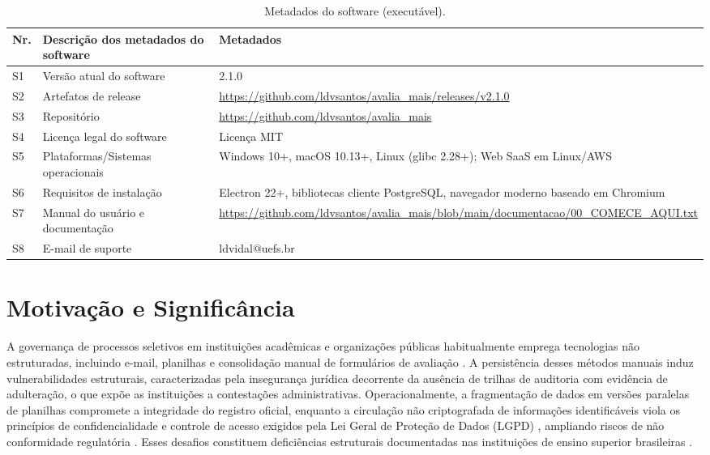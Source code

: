 \documentclass[preprint,12pt,a4paper]{elsarticle}
\begin{document}
\begin{table}[!h]
\begin{tabular}{|l|p{6.5cm}|p{6.5cm}|}
\hline
\textbf{Nr.} & \textbf{Descrição dos metadados do software} & \textbf{Metadados} \\
\hline
S1 & Versão atual do software & 2.1.0 \\
\hline
S2 & Artefatos de release & \url{https://github.com/ldvsantos/avalia_mais/releases/v2.1.0} \\
\hline
S3 & Repositório & \url{https://github.com/ldvsantos/avalia_mais} \\
\hline
S4 & Licença legal do software & Licença MIT \\
\hline
S5 & Plataformas/Sistemas operacionais & Windows 10+, macOS 10.13+, Linux (glibc 2.28+); Web SaaS em Linux/AWS \\
\hline
S6 & Requisitos de instalação & Electron 22+, bibliotecas cliente PostgreSQL, navegador moderno baseado em Chromium \\
\hline
S7 & Manual do usuário e documentação & \url{https://github.com/ldvsantos/avalia_mais/blob/main/documentacao/00_COMECE_AQUI.txt} \\
\hline
S8 & E-mail de suporte & ldvidal@uefs.br \\
\hline
\end{tabular}
\caption{Metadados do software (executável).}
\label{executableMetadata}
\end{table}

\section{Motivação e Significância}

A governança de processos seletivos em instituições acadêmicas e organizações públicas habitualmente emprega tecnologias não estruturadas, incluindo e-mail, planilhas e consolidação manual de formulários de avaliação \citep{Khan2021,Esposito2016}. A persistência desses métodos manuais induz vulnerabilidades estruturais, caracterizadas pela insegurança jurídica decorrente da ausência de trilhas de auditoria com evidência de adulteração, o que expõe as instituições a contestações administrativas. Operacionalmente, a fragmentação de dados em versões paralelas de planilhas compromete a integridade do registro oficial, enquanto a circulação não criptografada de informações identificáveis viola os princípios de confidencialidade e controle de acesso exigidos pela Lei Geral de Proteção de Dados (LGPD) \citep{LGPD2018}, ampliando riscos de não conformidade regulatória \citep{Cavoukian2011}. Esses desafios constituem deficiências estruturais documentadas nas instituições de ensino superior brasileiras \citep{Machado2018}.
\end{document}
